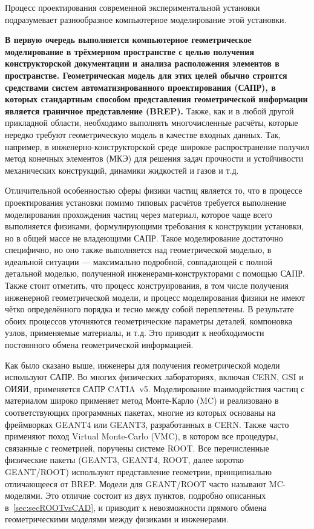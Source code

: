 Процесс проектирования современной экспериментальной установки подразумевает разнообразное компьютерное моделирование этой установки.

\textbf{В первую очередь выполняется компьютерное геометрическое моделирование в трёхмерном пространстве с целью получения конструкторской документации и анализа расположения элементов в пространстве. Геометрическая модель для этих целей обычно строится средствами систем автоматизированного проектирования (САПР), в которых стандартным способом представления геометрической информации является граничное представление (BREP).}
Также, как и в любой другой прикладной области, необходимо выполнять многочисленные расчёты, которые нередко требуют геометрическую модель в качестве входных данных.
Так, например, в инженерно-конструкторской среде широкое распространение получил метод конечных элементов (МКЭ) для решения задач прочности и устойчивости механических конструкций, динамики жидкостей и газов и т.д.

Отличительной особенностью сферы физики частиц является то, что в процессе проектирования установки помимо типовых расчётов требуется выполнение моделирования прохождения частиц через материал, которое чаще всего выполняется физиками, формулирующими требования к конструкции установки, но в общей массе не владеющими САПР. Такое моделирование достаточно специфично, но оно также выполняется над геометрической моделью, в идеальной ситуации --- максимально подробной, совпадающей с полной детальной моделью, полученной инженерами-конструкторами с помощью САПР. Также стоит отметить, что процесс конструирования, в том числе получения инженерной геометрической модели, и процесс моделирования физики не имеют чётко определённого порядка и тесно между собой переплетены. В результате обоих процессов уточняются геометрические параметры деталей, компоновка узлов, применяемые материалы, и т.д. Это приводит к необходимости постоянного обмена геометрической информацией.

Как было сказано выше, инженеры для получения геометрической модели используют САПР. Во многих физических лабораториях, включая CERN, GSI и ОИЯИ, применяется САПР CATIA~v5. Моделирование взаимодействия частиц с материалом широко применяет метод Монте-Карло (MC) и реализовано в соответствующих программных пакетах, многие из которых основаны на фреймворках GEANT4 или GEANT3, разработанных в CERN. Также часто применяют поход Virtual Monte-Carlo (VMC), в котором все процедуры, связанные с геометрией, поручены системе ROOT. Все перечисленные физические пакеты (GEANT3, GEANT4, ROOT, далее коротко GEANT/ROOT) используют представление геометрии, принципиально отличающееся от BREP. Модели для GEANT/ROOT часто называют MC-моделями. Это отличие состоит из двух пунктов, подробно описанных в~\ref{sec:secROOTvsCAD}, и приводит к невозможности прямого обмена геометрическими моделями между физиками и инженерами.

